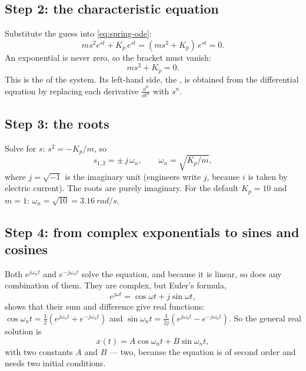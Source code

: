 \subsection{Step 2: the characteristic equation}
Substitute the guess into \cref{eq:spring-ode}:
\begin{equation}
  m s^2 e^{st} + K_p\,e^{st} = (m s^2 + K_p)\,e^{st} = 0 .
\end{equation}
An exponential is never zero, so the bracket must vanish:
\begin{equation}\label{eq:spring-char}
  m s^2 + K_p = 0 .
\end{equation}
This is the  of the system. Its left-hand side, the , is obtained from the differential equation by replacing each derivative $\frac{\dd^n}{\dd t^n}$ with $s^n$.

\subsection{Step 3: the roots}
Solve for $s$: $s^2 = -K_p/m$, so
\begin{equation}
  s_{1,2} = \pm\, j\,\omega_n,\qquad \omega_n = \sqrt{K_p/m},
\end{equation}
where $j = \sqrt{-1}$ is the imaginary unit (engineers write $j$, because $i$ is taken by electric current). The roots are purely imaginary. For the default $K_p = 10$ and $m = 1$: $\omega_n = \sqrt{10} = \SI{3.16}{rad/s}$.

\subsection{Step 4: from complex exponentials to sines and cosines}
Both $e^{j\omega_n t}$ and $e^{-j\omega_n t}$ solve the equation, and because it is linear, so does any combination of them. They are complex, but Euler's formula,
\begin{equation}
  e^{j\omega t} = \cos\omega t + j\sin\omega t ,
\end{equation}
shows that their sum and difference give real functions: $\cos\omega_n t = \tfrac12(e^{j\omega_n t} + e^{-j\omega_n t})$ and $\sin\omega_n t = \tfrac1{2j}(e^{j\omega_n t} - e^{-j\omega_n t})$. So the general real solution is
\begin{equation}\label{eq:spring-general}
  x(t) = A\cos\omega_n t + B\sin\omega_n t ,
\end{equation}
with two constants $A$ and $B$ — two, because the equation is of second order and needs two initial conditions.

